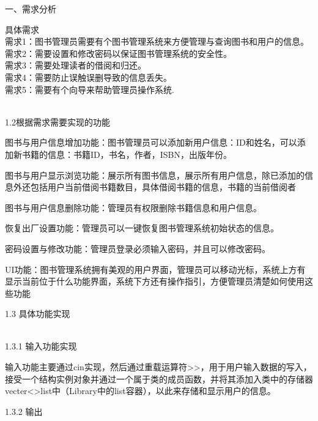 \documentclass{article}
\begin{document}
\noindent
\begin{Large}
一、需求分析\\
\end{Large}

 具体需求\\
需求1：图书管理员需要有个图书管理系统来方便管理与查询图书和用户的信息。\\
需求2：需要设置和修改密码以保证图书管理系统的安全性。\\
需求3：需要处理读者的借阅和归还。\\
需求4：需要防止误触误删导致的信息丢失。\\
需求5：需要有个向导来帮助管理员操作系统.\\\\
\begin{large}
    1.2根据需求需要实现的功能\\
\end{large}

图书与用户信息增加功能：图书管理员可以添加新用户信息：ID和姓名，可以添加新书籍的信息：书籍ID，书名，作者，ISBN，出版年份。

图书与用户显示浏览功能：展示所有图书信息，展示所有用户信息，除已添加的信息外还包括用户当前借阅书籍数目，具体借阅书籍的信息，书籍的当前借阅者

图书与用户信息删除功能：管理员有权限删除书籍信息和用户信息。

恢复出厂设置功能：管理员可以一键恢复图书管理系统初始状态的信息。

密码设置与修改功能：管理员登录必须输入密码，并且可以修改密码。

UI功能：图书管理系统拥有美观的用户界面，管理员可以移动光标，系统上方有显示当前位于什么功能界面，系统下方还有操作指引，方便管理员清楚如何使用这些功能\\
\begin{Large}
    1.3 具体功能实现\\\\
\end{Large}
\begin{large}
  1.3.1 输入功能实现\\
\end{large}

输入功能主要通过cin实现，然后通过重载运算符>>，用于用户输入数据的写入，接受一个结构实例对象并通过一个属于类的成员函数，并将其添加入类中的存储器vecter<>list中（Library中的list容器），以此来存储和显示用户的信息。\\
\begin{large}
  1.3.2 输出\\
\end{large}
\end{document}
